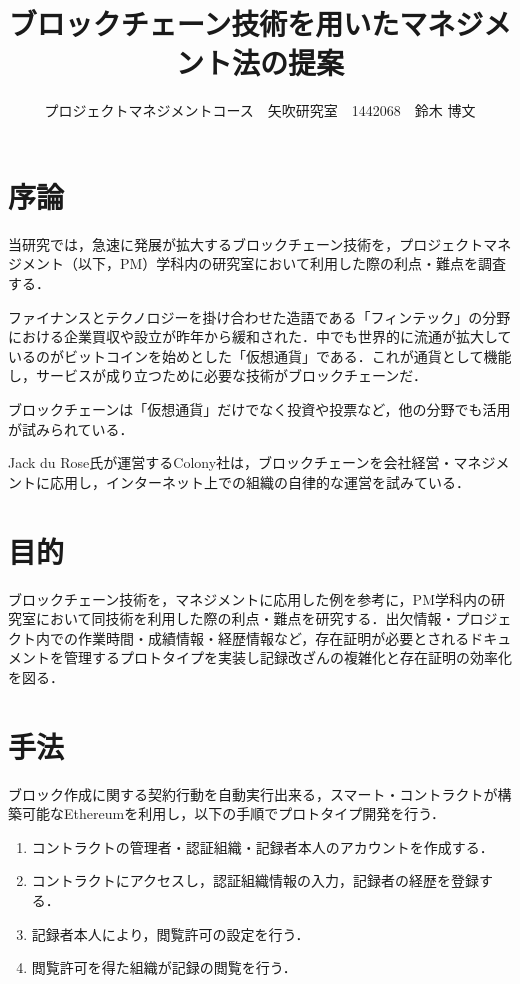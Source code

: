 \documentclass[uplatex,twocolumn,dvipdfmx]{jsarticle}
\title{\vspace{-5mm}\fontsize{14pt}{0pt}\selectfont ブロックチェーン技術を用いたマネジメント法の提案}
\author{\normalsize プロジェクトマネジメントコース　矢吹研究室　1442068　鈴木 博文}
\date{}
\begin{document}
\fontsize{10.5pt}{\baselineskip}\selectfont
\maketitle





\section{序論}\label{序論}

当研究では，急速に発展が拡大するブロックチェーン技術を，プロジェクトマネジメント（以下，PM）学科内の研究室において利用した際の利点・難点を調査する．

ファイナンスとテクノロジーを掛け合わせた造語である「フィンテック」の分野における企業買収や設立が昨年から緩和された\cite{touyou}．中でも世界的に流通が拡大しているのがビットコインを始めとした「仮想通貨」である．これが通貨として機能し，サービスが成り立つために必要な技術がブロックチェーンだ．

ブロックチェーンは「仮想通貨」だけでなく投資や投票など，他の分野でも活用が試みられている．

Jack du Rose氏が運営するColony社は，ブロックチェーンを会社経営・マネジメントに応用し，インターネット上での組織の自律的な運営を試みている\cite{wired}．

\section{目的}

ブロックチェーン技術を，マネジメントに応用した例を参考に，PM学科内の研究室において同技術を利用した際の利点・難点を研究する．出欠情報・プロジェクト内での作業時間・成績情報・経歴情報など，存在証明が必要とされるドキュメントを管理するプロトタイプを実装し記録改ざんの複雑化と存在証明の効率化を図る．

\section{手法}

ブロック作成に関する契約行動を自動実行出来る，スマート・コントラクトが構築可能なEthereumを利用し，以下の手順でプロトタイプ開発を行う．

\begin{enumerate}
\item コントラクトの管理者・認証組織・記録者本人のアカウントを作成する．
\item コントラクトにアクセスし，認証組織情報の入力，記録者の経歴を登録する．
\item 記録者本人により，閲覧許可の設定を行う．
\item 閲覧許可を得た組織が記録の閲覧を行う．
\end{enumerate}
\end{document}

